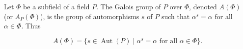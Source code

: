 Let $\Phi$ be a subfield of a field $P$. The Galois group of $P$ over $\Phi$, denoted $A(\Phi)$ (or $A_P(\Phi)$), is the group of automorphisms $s$ of $P$ such that $\alpha^s = \alpha$ for all $\alpha \in \Phi$. Thus

$$A(\Phi) = \{s \in \operatorname{Aut}(P) \mid \alpha^s = \alpha \text{ for all } \alpha \in \Phi\}.$$

